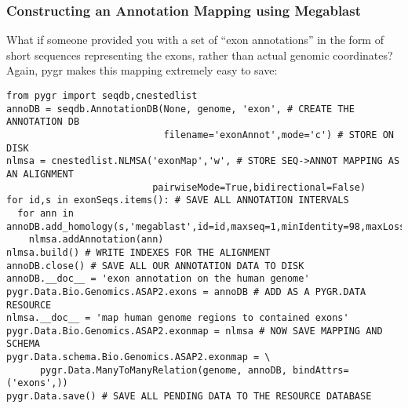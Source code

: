 \documentclass{howto}
\begin{document}
\subsubsection{Constructing an Annotation Mapping using Megablast}
What if someone provided you with a set of ``exon annotations'' in the form
of short sequences representing the exons, rather than actual genomic
coordinates?  Again, pygr makes this mapping extremely easy to save:
\begin{verbatim}
from pygr import seqdb,cnestedlist
annoDB = seqdb.AnnotationDB(None, genome, 'exon', # CREATE THE ANNOTATION DB
                            filename='exonAnnot',mode='c') # STORE ON DISK
nlmsa = cnestedlist.NLMSA('exonMap','w', # STORE SEQ->ANNOT MAPPING AS AN ALIGNMENT
                          pairwiseMode=True,bidirectional=False)
for id,s in exonSeqs.items(): # SAVE ALL ANNOTATION INTERVALS
  for ann in annoDB.add_homology(s,'megablast',id=id,maxseq=1,minIdentity=98,maxLoss=2):
    nlmsa.addAnnotation(ann)
nlmsa.build() # WRITE INDEXES FOR THE ALIGNMENT
annoDB.close() # SAVE ALL OUR ANNOTATION DATA TO DISK
annoDB.__doc__ = 'exon annotation on the human genome'
pygr.Data.Bio.Genomics.ASAP2.exons = annoDB # ADD AS A PYGR.DATA RESOURCE
nlmsa.__doc__ = 'map human genome regions to contained exons'
pygr.Data.Bio.Genomics.ASAP2.exonmap = nlmsa # NOW SAVE MAPPING AND SCHEMA
pygr.Data.schema.Bio.Genomics.ASAP2.exonmap = \
      pygr.Data.ManyToManyRelation(genome, annoDB, bindAttrs=('exons',))
pygr.Data.save() # SAVE ALL PENDING DATA TO THE RESOURCE DATABASE
\end{verbatim}
\end{document}
